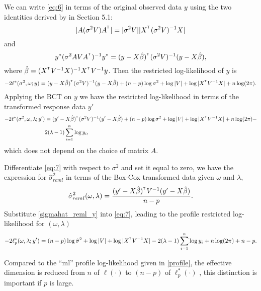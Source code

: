 \documentclass{article}\usepackage[]{graphicx}\usepackage[]{color}
\def\T{{\footnotesize {^{_{\sf T}}}}}
\begin{document}
We can write \eqref{eq:6} in terms of the original observed data $y$ using the two identities derived by \cite{searle1978notebook} in Section 5.1:
$$|A (\sigma^2V)A^\T|=|\sigma^2V||X^\T (\sigma^2V)^{-1}X|$$ and $$y^*(\sigma^2 AVA^\T)^{-1}y^*=(y-X\hat{\beta})^\T (\sigma^2 V)^{-1}(y-X\hat{\beta}),$$ where $\hat{\beta}=(X^\T V^{-1}X)^{-1} X^\T V^{-1}y$.  Then the restricted log-likelihood of $y$ is
\begin{align*}
-2\ell^*(\sigma^2, \omega;y)=(y-X\hat{\beta})^\T(\sigma^2V)^{-1}(y-X\hat{\beta})+(n-p)\log \sigma^2+\log |V|+\log|X^\T V^{-1}X|+n\log(2\pi).
\end{align*}
Applying the BCT on $y$ we have the restricted log-likelihood in terms of the transformed response data $y'$
\begin{align}
-2\ell^*(\sigma^2, \omega, \lambda;y')&=(y'-X\hat{\beta})^\T(\sigma^2V)^{-1}(y'-X\hat{\beta})+(n-p)\log \sigma^2+\log |V|+\log|X^\T V^{-1}X|+n\log(2\pi)-\notag\\
&2(\lambda-1)\sum_{i=1}^{n}\log y_i,\label{eq:7}
\end{align}
which does not depend on the choice of matrix $A$.

Differentiate \eqref{eq:7} with respect to $\sigma^2$ and set it equal to zero, we have the expression for $\hat{\sigma}_{reml}^2$ in terms of the Box-Cox transformed data given $\omega$ and $\lambda$,
\begin{equation}\label{sigmahat_reml_y}
\hat{\sigma}_{reml}^2(\omega, \lambda)=\frac{(y'-X\hat{\beta})^\T  V^{-1}(y'-X\hat{\beta})}{n-p}.
\end{equation}
Substitute \eqref{sigmahat_reml_y} into \eqref{eq:7}, leading to the profile restricted log-likelihood for $(\omega, \lambda)$
\begin{equation}\label{remlpro}
-2\ell^*_p(\omega, \lambda;y')=(n-p)\log \hat{\sigma}^2+\log |V|+\log |X^\T V^{-1}X|-2(\lambda-1)\sum_{i=1}^{n}\log y_i+n\log(2\pi)+n-p.
\end{equation}

Compared to the ``ml'' profile log-likelihood given in \eqref{profile}, the effective dimension is reduced from $n$ of $\ell(\cdot)$  to $(n-p)$ of $\ell^*_p(\cdot)$ , this distinction is important if $p$ is large.
\end{document}
